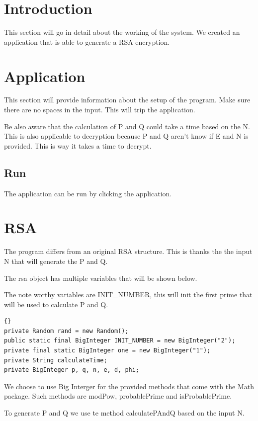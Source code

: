 \section{Introduction} \label{man-introduction}
This section will go in detail about the working of the system.
We created an application that is able to generate a RSA encryption.

\section{Application} \label{man-application}
This section will provide information about the setup of the program.
Make sure there are no spaces in the input. This will trip the application.

Be also aware that the calculation of P and  Q could take a time based on the N.
This is also applicable to decryption because P and Q aren't know if E and N is provided. This is way it takes a time to decrypt. 
\subsection{Run}
The application can be run by clicking the application.

\section{RSA}
The program differs from an original RSA structure. This is thanks the the input N that will generate the P and Q.

The rsa object has multiple variables that will be shown below.

The note worthy variables are INIT\_NUMBER, this will init the first prime that will be used to calculate P and Q.

\begin{lstlisting}{}
private Random rand = new Random();
public static final BigInteger INIT_NUMBER = new BigInteger("2");
private final static BigInteger one = new BigInteger("1");
private String calculateTime;
private BigInteger p, q, n, e, d, phi;
\end{lstlisting}

We choose to use Big Interger for the provided methods that come with the Math package.
Such methods are modPow, probablePrime and isProbablePrime.

To generate P and Q we use te method calculatePAndQ based on the input N.


